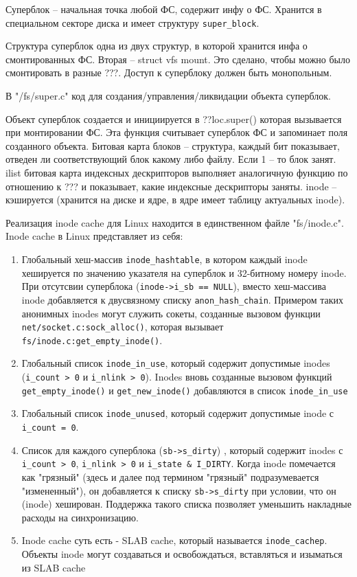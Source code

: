  

Суперблок – начальная точка любой ФС, содержит инфу о ФС. Хранится в специальном секторе диска и имеет структуру \verb|super_block|.

 

Структура суперблок одна из двух структур, в которой хранится инфа о смонтированных ФС. Вторая – struct vfs mount. Это сделано, чтобы можно было смонтировать в разные ???. Доступ к суперблоку должен быть монопольным.

 

В "/fs/super.c" код для создания/управления/ликвидации объекта суперблок.

Объект суперблок создается и инициируется в ??loc.super() которая вызывается при монтировании ФС. Эта функция считывает суперблок ФС и запоминает поля созданного объекта. 
Битовая карта блоков – структура, каждый бит показывает, отведен ли соответствующий блок какому либо файлу. Если 1 – то блок занят.
ilist битовая карта индексных дескрипторов выполняет аналогичную функцию по отношению к ??? и показывает, какие индексные дескрипторы заняты. inode – кэшируется (хранится на диске и ядре, в ядре имеет таблицу актуальных inode).

Реализация inode cache для Linux находится в единственном файле "fs/inode.c".
Inode cache в Linux представляет из себя:
\begin{enumerate}
	\item Глобальный хеш-массив \verb|inode_hashtable|, в котором каждый inode хешируется по значению указателя на суперблок и 32-битному номеру inode. При отсутсвии суперблока (\verb|inode->i_sb == NULL|), вместо хеш-массива inode добавляется к двусвязному списку \verb|anon_hash_chain|. Примером таких анонимных inodes могут служить сокеты, созданные вызовом функции \verb|net/socket.c:sock_alloc()|, которая вызывает \verb|fs/inode.c:get_empty_inode()|.
	\item Глобальный список \verb|inode_in_use|, который содержит допустимые inodes (\verb|i_count > 0| и \verb|i_nlink > 0|). Inodes вновь созданные вызовом функций \verb|get_empty_inode()| и \verb|get_new_inode()| добавляются в список \verb|inode_in_use|
	\item Глобальный список \verb|inode_unused|, который содержит допустимые inode с \verb|i_count = 0|.
	\item Список для каждого суперблока (\verb|sb->s_dirty|) , который содержит inodes с \verb|i_count > 0|, \verb|i_nlink > 0| и \verb|i_state & I_DIRTY|. Когда inode помечается как "грязный" (здесь и далее под термином "грязный" подразумевается "измененный"), он добавляется к списку \verb|sb->s_dirty| при условии, что он (inode) хеширован. Поддержка такого списка позволяет уменьшить накладные расходы на синхронизацию.
	\item Inode cache суть есть - SLAB cache, который называется \verb|inode_cachep|. Объекты inode могут создаваться и освобождаться, вставляться и изыматься из SLAB cache
\end{enumerate}

